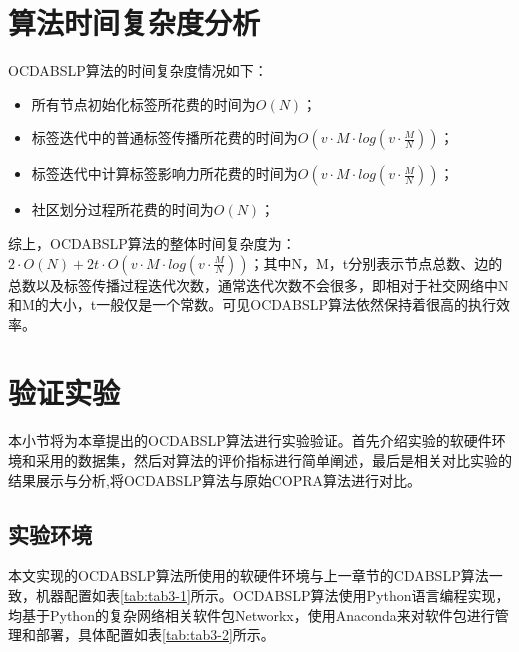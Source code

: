 \section{算法时间复杂度分析}

OCDABSLP算法的时间复杂度情况如下：

\begin{itemize}
  \item 所有节点初始化标签所花费的时间为$O(N)$；
  \item 标签迭代中的普通标签传播所花费的时间为$O(v \cdot M \cdot log(v \cdot \frac{M}{N}))$；
  \item 标签迭代中计算标签影响力所花费的时间为$O(v \cdot M \cdot log(v \cdot \frac{M}{N}))$；
  \item 社区划分过程所花费的时间为$O(N)$；
\end{itemize}

综上，OCDABSLP算法的整体时间复杂度为：$2 \cdot O(N)+2t \cdot O(v \cdot M \cdot log(v \cdot \frac{M}{N}))$；其中N，M，t分别表示节点总数、边的总数以及标签传播过程迭代次数，通常迭代次数不会很多，即相对于社交网络中N和M的大小，t一般仅是一个常数。可见OCDABSLP算法依然保持着很高的执行效率。






\section{验证实验}

本小节将为本章提出的OCDABSLP算法进行实验验证。首先介绍实验的软硬件环境和采用的数据集，然后对算法的评价指标进行简单阐述，最后是相关对比实验的结果展示与分析,将OCDABSLP算法与原始COPRA算法进行对比。

\subsection{实验环境}
本文实现的OCDABSLP算法所使用的软硬件环境与上一章节的CDABSLP算法一致，机器配置如表\ref{tab:tab3-1}所示。OCDABSLP算法使用Python语言编程实现，均基于Python的复杂网络相关软件包Networkx，使用Anaconda来对软件包进行管理和部署，具体配置如表\ref{tab:tab3-2}所示。

